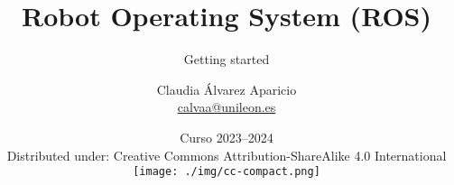 \documentclass[10pt, pdftex, xcolor=dvipsnames, table, aspectratio=1610]{beamer}
\author{Claudia Álvarez Aparicio\texorpdfstring{\\ \url{calvaa@unileon.es}}{}}
\title{Robot Operating System (ROS)}
\subtitle{Getting started}
\institute{\texttt{[image: ./img/robotica-seguridad.png]}\hspace{1cm}\texttt{[image: ./img/ule.png]}\\

\vspace{.2cm}
\textbf{Seguridad en Sistemas Ciberfísicos}}
\date{Curso 2023--2024\\{\tiny Distributed under: Creative Commons Attribution-ShareAlike 4.0 International}\\
\vspace{0,025cm}
\texttt{[image: ./img/cc-compact.png]}}
\begin{document}
\begin{frame}[plain]
    \titlepage
\end{frame}

%
%
%
%



\begin{frame}[plain]
    \titlepage
\end{frame}
\end{document}
